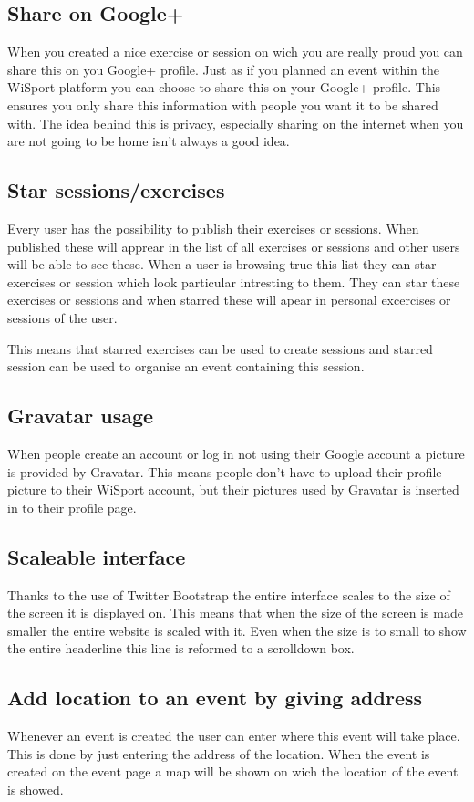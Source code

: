 \documentclass[11pt,a4paper]{scrartcl}
\begin{document}
\subsection{Share on Google+}
When you created a nice exercise or session on wich you are really proud you can
share this on you Google+ profile. Just as if you planned an event within the WiSport
platform you can choose to share this on your Google+ profile. This ensures you only
share this information with people you want it to be shared with. The idea behind this
is privacy, especially sharing on the internet when you are not going to be home isn't
always a good idea.
\subsection{Star sessions/exercises}
Every user has the possibility to publish their exercises or sessions. When published
these will apprear in the list of all exercises or sessions and other users will be able to
see these. When a user is browsing true this list they can star exercises or session which
look particular intresting to them. They can star these exercises or sessions and when
starred these will apear in personal excercises or sessions of the user.

This means that starred exercises can be used to create sessions and starred session can
be used to organise an event containing this session.

\subsection{Gravatar usage}
When people create an account or log in not using their Google account a picture is provided by Gravatar. This means people don't have 
to upload their profile picture to their WiSport account, but their pictures used by Gravatar is inserted in to their profile page.
\subsection{Scaleable interface}
Thanks to the use of Twitter Bootstrap the entire interface scales to the size of the screen it is displayed on. This means that when
the size of the screen is made smaller the entire website is scaled with it. Even when the size is to small to show the entire headerline
this line is reformed to a scrolldown box.

\subsection{Add location to an event by giving address}
Whenever an event is created the user can enter where this event will take place. This is done by just entering the address of the 
location. When the event is created on the event page a map will be shown on wich the location of the event is showed.
\end{document}
